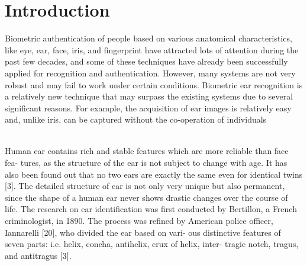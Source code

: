 \chapter{Introduction} \label{sec:intro} Biometric authentication of people based on various anatomical characteristics, like eye, ear, face, iris, and fingerprint have attracted lots of attention during the past few decades, and some of these techniques have already been successfully applied for recognition and authentication. However, many systems are not very robust and may fail to work under certain conditions. Biometric ear recognition is a relatively new technique that may surpass the existing systems due to several significant reasons. For example, the acquisition of ear images is relatively easy and, unlike iris, can be captured without the co-operation of individuals \cite{pflug2012ear}

\\Human ear contains rich and stable features which are more reliable than face fea- tures, as the structure of the ear is not subject to change with age. It has also been found out that no two ears are exactly the same even for identical twins [3]. The detailed structure of ear is not only very unique but also permanent, since the shape of a human ear never shows drastic changes over the course of life. The research on ear identification was first conducted by Bertillon, a French criminologist, in 1890. The process was refined by American police officer, Iannarelli [20], who divided the ear based on vari- ous distinctive features of seven parts: i.e. helix, concha, antihelix, crux of helix, inter- tragic notch, tragus, and antitragus [3].

